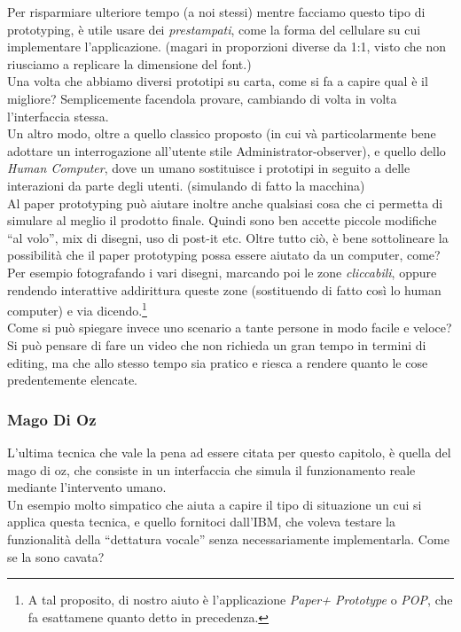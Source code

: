 \documentclass[oneside]{book}
\begin{document}
			Per risparmiare ulteriore tempo (a noi stessi) mentre facciamo questo tipo di prototyping, è utile usare dei \emph{prestampati}, come la forma del cellulare su cui implementare l'applicazione. (magari in proporzioni diverse da 1:1, visto che non riusciamo a replicare la dimensione del font.) \\

			Una volta che abbiamo diversi prototipi su carta, come si fa a capire qual è il migliore? Semplicemente facendola provare, cambiando di volta in volta l'interfaccia stessa. \\
			Un altro modo, oltre a quello classico proposto (in cui và particolarmente bene adottare un interrogazione all'utente stile Administrator-observer), e quello dello \emph{Human Computer}, dove un umano sostituisce i prototipi in seguito a delle interazioni da parte degli utenti. (simulando di fatto la macchina) \\
			Al paper prototyping può aiutare inoltre anche qualsiasi cosa che ci permetta di simulare al meglio il prodotto finale. Quindi sono ben accette piccole modifiche ``al volo'', mix di disegni, uso di post-it etc. Oltre tutto ciò, è bene sottolineare la possibilità che il paper prototyping possa essere aiutato da un computer, come? Per esempio fotografando i vari disegni, marcando poi le zone \emph{cliccabili}, oppure rendendo interattive addirittura queste zone (sostituendo di fatto così lo human computer) e via dicendo.\footnote{ A tal proposito, di nostro aiuto è l'applicazione \emph{Paper+ Prototype} o \emph{POP}, che fa esattamene quanto detto in precedenza.}\\

			Come si può spiegare invece uno scenario a tante persone in modo facile e veloce? Si può pensare di fare un video che non richieda un gran tempo in termini di editing, ma che allo stesso tempo sia pratico e riesca a rendere quanto le cose predentemente elencate. \\
			\subsubsection{Mago Di Oz} \label{sec:Oz}
			L'ultima tecnica che vale la pena ad essere citata per questo capitolo, è quella del mago di oz, che consiste in un interfaccia che simula il funzionamento reale mediante l'intervento umano. \\
			Un esempio molto simpatico che aiuta a capire il tipo di situazione un cui si applica questa tecnica, e quello fornitoci dall'IBM, che voleva testare la funzionalità della ``dettatura vocale'' senza necessariamente implementarla. Come se la sono cavata? \\
\end{document}
